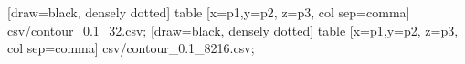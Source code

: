   [draw=black, densely dotted] table [x=p1,y=p2, z=p3, col sep=comma] {csv/contour_0.1_32.csv}; 
  [draw=black, densely dotted] table [x=p1,y=p2, z=p3, col sep=comma] {csv/contour_0.1_8216.csv}; 
